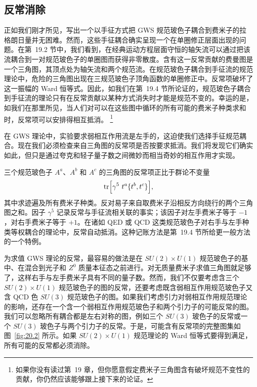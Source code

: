 \subsection{反常消除}

正如我们刚才所见，写出一个以手征方式把 GWS 规范玻色子耦合到费米子的拉格朗日量并无困难。然而，这些手征耦合确实呈现一个在单圈修正层面出现的问题。在第~19.2 节中，我们看到，在经典运动方程层面守恒的轴矢流可以通过把该流耦合到一对规范玻色子的单圈图而获得非零散度。含有这一反常贡献的费曼图是一个三角图，其顶点处为轴矢流和两个规范流。在规范玻色子耦合到手征流的规范理论中，危险的三角图出现在三规范玻色子顶角函数的单圈修正中。反常项破坏了这一振幅的 Ward 恒等式。因此，如我们在第~19.4 节所论证的，规范玻色子耦合到手征流的理论只有在反常贡献以某种方式消失时才能是规范不变的。幸运的是，如我们在那里所见，当人们对可以在这些图中循环的所有可能的费米子种类求和时，反常项可以安排得相互抵消。%
\footnote{如果你没有读过第~19 章，但你愿意假定费米子三角图含有破坏规范不变性的贡献，你仍然应该能够跟上接下来的论证。}

在 GWS 理论中，实验要求弱相互作用流是左手的，这迫使我们选择手征规范耦合。现在我们必须检查来自三角图的反常项是否按要求抵消。我们将发现它们确实如此，但只是通过夸克和轻子量子数之间微妙而相当奇妙的相互作用才实现。

三个规范玻色子 $A^a$、$A^b$ 和 $A^c$ 的三角图的反常项正比于群论不变量
\begin{equation}
  \mathrm{tr}\Bigl[ \gamma^5\ t^a\{t^b, t^c\} \Bigr] ,
  \label{eq:20.81}
\end{equation}
其中求迹遍及所有费米子种类。反对易子来自取费米子沿相反方向绕行的两个三角图之和。因子 $\gamma^5$ 记录反常与手征流相关联的事实；该因子对左手费米子等于 $-1$，对右手费米子等于 $+1$。在诸如 QED 或 QCD 这类规范玻色子对右手与左手种类等权耦合的理论中，反常自动抵消。这种记账方法是第~19.4 节所给更一般方法的一个特例。

为求值 GWS 理论的反常，最容易的做法是在 $SU(2)\times U(1)$ 规范玻色子的基中、在混合到光子和 $Z^0$ 质量本征态之前进行。对无质量费米子求值三角图就足够了，这样右手与左手费米子具有不同的量子数。然而，我们不仅要考虑含三个 $SU(2)\times U(1)$ 规范玻色子的图的反常，还要考虑既含弱相互作用规范玻色子又含 QCD 色 $SU(3)$ 规范玻色子的图。如果我们考虑引力对弱相互作用规范理论的影响，还存在一个含一个弱相互作用规范玻色子和两个引力子的可能反常的图。我们可以忽略所有耦合都是左右对称的图，例如三个 $SU(3)$ 玻色子的反常或一个 $SU(3)$ 玻色子与两个引力子的反常。于是，可能含有反常项的完整图集如图~\ref{fig:20.2} 所示。如果 $SU(2)\times U(1)$ 规范理论的 Ward 恒等式要得到满足，所有可能的反常都必须消除。


